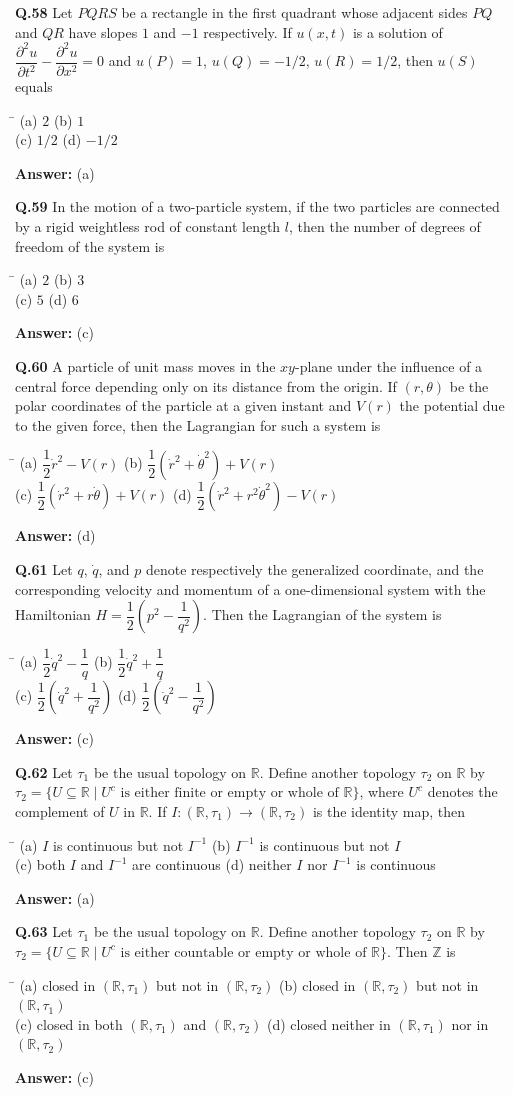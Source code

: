 \documentclass[11pt,a4paper]{article}
\newcommand{\optsfour}[4]{%
  \begin{tabbing}
    \hspace{0.48\linewidth}\=\kill
    (a) #1 \> (b) #2 \\[2pt]
    (c) #3 \> (d) #4
  \end{tabbing}%
}
\newcommand{\ans}[1]{\textbf{Answer:} #1\par\medskip}
\begin{document}
\textbf{Q.58} Let $PQRS$ be a rectangle in the first quadrant whose adjacent sides $PQ$ and $QR$ have slopes $1$ and $-1$ respectively. If $u(x,t)$ is a solution of $\dfrac{\partial^2 u}{\partial t^2} - \dfrac{\partial^2 u}{\partial x^2} = 0$ and $u(P) = 1$, $u(Q) = -1/2$, $u(R) = 1/2$, then $u(S)$ equals
\optsfour{$2$}{$1$}{$1/2$}{$-1/2$}
\ans{(a)}

\textbf{Q.59} In the motion of a two-particle system, if the two particles are connected by a rigid weightless rod of constant length $l$, then the number of degrees of freedom of the system is
\optsfour{$2$}{$3$}{$5$}{$6$}
\ans{(c)}

\textbf{Q.60} A particle of unit mass moves in the $xy$-plane under the influence of a central force depending only on its distance from the origin. If $(r, \theta)$ be the polar coordinates of the particle at a given instant and $V(r)$ the potential due to the given force, then the Lagrangian for such a system is
\optsfour{$\dfrac{1}{2}\dot{r}^2 - V(r)$}{$\dfrac{1}{2}(\dot{r}^2 + \dot{\theta}^2) + V(r)$}{$\dfrac{1}{2}(\dot{r}^2 + r\dot{\theta}) + V(r)$}{$\dfrac{1}{2}(\dot{r}^2 + r^2\dot{\theta}^2) - V(r)$}
\ans{(d)}

\textbf{Q.61} Let $q$, $\dot{q}$, and $p$ denote respectively the generalized coordinate, and the corresponding velocity and momentum of a one-dimensional system with the Hamiltonian $H = \dfrac{1}{2}\!\left(p^2 - \dfrac{1}{q^2}\right)$. Then the Lagrangian of the system is
\optsfour{$\dfrac{1}{2}\dot{q}^2 - \dfrac{1}{q}$}{$\dfrac{1}{2}\dot{q}^2 + \dfrac{1}{q}$}{$\dfrac{1}{2}\!\left(\dot{q}^2 + \dfrac{1}{q^2}\right)$}{$\dfrac{1}{2}\!\left(\dot{q}^2 - \dfrac{1}{q^2}\right)$}
\ans{(c)}

\textbf{Q.62} Let $\tau_1$ be the usual topology on $\mathbb{R}$. Define another topology $\tau_2$ on $\mathbb{R}$ by $\tau_2 = \{U \subseteq \mathbb{R} \mid U^c \text{ is either finite or empty or whole of } \mathbb{R}\}$, where $U^c$ denotes the complement of $U$ in $\mathbb{R}$. If $I : (\mathbb{R}, \tau_1) \to (\mathbb{R}, \tau_2)$ is the identity map, then
\optsfour{$I$ is continuous but not $I^{-1}$}{$I^{-1}$ is continuous but not $I$}{both $I$ and $I^{-1}$ are continuous}{neither $I$ nor $I^{-1}$ is continuous}
\ans{(a)}

\textbf{Q.63} Let $\tau_1$ be the usual topology on $\mathbb{R}$. Define another topology $\tau_2$ on $\mathbb{R}$ by $\tau_2 = \{U \subseteq \mathbb{R} \mid U^c \text{ is either countable or empty or whole of } \mathbb{R}\}$. Then $\mathbb{Z}$ is
\optsfour{closed in $(\mathbb{R}, \tau_1)$ but not in $(\mathbb{R}, \tau_2)$}{closed in $(\mathbb{R}, \tau_2)$ but not in $(\mathbb{R}, \tau_1)$}{closed in both $(\mathbb{R}, \tau_1)$ and $(\mathbb{R}, \tau_2)$}{closed neither in $(\mathbb{R}, \tau_1)$ nor in $(\mathbb{R}, \tau_2)$}
\ans{(c)}
\end{document}
